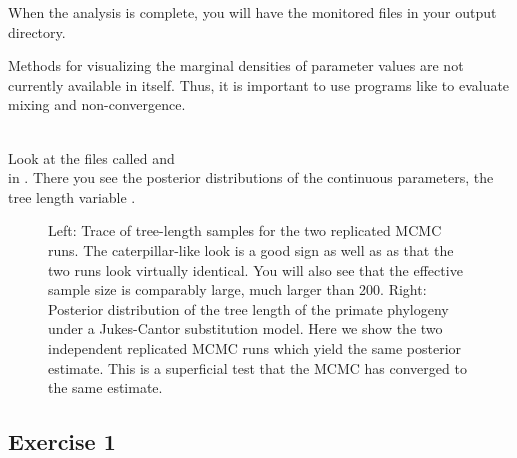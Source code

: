 When the analysis is complete, you will have the monitored files in your output directory.


Methods for visualizing the marginal densities of parameter values are not currently available in \RevBayes itself. 
Thus, it is important to use programs like \Tracer \citep{Rambaut2011} to evaluate mixing and non-convergence.

\noindent \\ \impmark Look at the files called  and \\ in \Tracer. There you see the posterior distributions of the continuous parameters, \EG the tree length variable .
\begin{figure}[htbp!]
\centering
{}
\caption{\small Left: Trace of tree-length samples for the two replicated MCMC runs. 
The caterpillar-like look is a good sign as well as as that the two runs look virtually identical.
You will also see that the effective sample size is comparably large, \IE much larger than 200.
Right: Posterior distribution of the tree length of the primate phylogeny under a Jukes-Cantor substitution model. 
Here we show the two independent replicated MCMC runs which yield the same posterior estimate.
This is a superficial test that the MCMC has converged to the same estimate.}
\label{fig:jc_tree}
\end{figure}

\subsection{Exercise 1}

